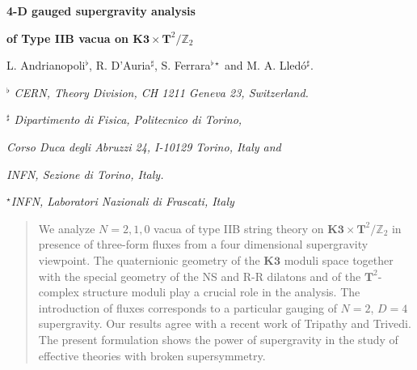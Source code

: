 \documentclass[a4paper,12pt]{article}
\begin{document}


\newcommand{\id}{\relax{\rm 1\kern-.28em 1}}

\newcommand{\R}{\mathbb{R}}
\newcommand{\C}{\mathbb{C}}
\newcommand{\Z}{\mathbb{Z}}


\newcommand{\K}{\mathbf{K3}}
\newcommand{\T}{\mathbf{T}}


\newcommand{\rSO}{\mathrm{SO}}
\newcommand{\rGL}{\mathrm{GL}}
\newcommand{\rSL}{\mathrm{SL}}
\newcommand{\rSU}{\mathrm{SU}}
\newcommand{\rSp}{\mathrm{Sp}}
\newcommand{\rUSp}{\mathrm{USp}}
\newcommand{\rU}{\mathrm{U}}

\newcommand{\fsu}{\mathfrak{su}}
\newcommand{\fso}{\mathfrak{so}}
\newcommand{\fh}{\mathfrak{h}}
\newcommand{\fp}{\mathfrak{p}}

\newcommand{\cM}{\mathcal{M}}
\newcommand{\cN}{\mathcal{N}}
\newcommand{\cL}{\mathcal{L}}
\newcommand{\cH}{\mathcal{H}}

\vskip 1cm


  \centerline{\LARGE \bf 4-D gauged supergravity analysis
  }

  \bigskip

  \centerline{\LARGE \bf  of Type IIB vacua on  $\K\times \T^2/\Z_2$
  }


 \vskip 1.5cm
\centerline{L. Andrianopoli$^\flat$, R. D'Auria$^\sharp$,  S.
Ferrara$^{\flat \star}$ and M. A. Lled\'o$^\sharp$.}

\vskip 1cm

\centerline{\it $^\flat$ CERN, Theory Division, CH 1211 Geneva 23,
Switzerland.}

\bigskip



\centerline{\it $^\sharp$ Dipartimento di Fisica, Politecnico di
Torino,} \centerline{\it Corso Duca degli Abruzzi 24, I-10129
Torino, Italy  and  } \centerline{\it   INFN, Sezione di Torino,
Italy. }

\bigskip




\centerline{$^\star$\it INFN, Laboratori Nazionali di Frascati,
Italy}







\vskip 1.5cm

\begin{abstract}
We analyze $N=2,1,0$ vacua of type IIB string theory on $\K\times
\T^2/\Z_2$ in presence of three-form fluxes from a four
dimensional supergravity viewpoint. The quaternionic geometry of
the $\K$ moduli space together with the special geometry of the NS
and R-R dilatons and of the $\T^2$-complex structure moduli play a
crucial role in the analysis. The introduction of fluxes
corresponds to a particular gauging of $N=2$, $D=4$ supergravity.
Our results agree with a recent work of Tripathy and Trivedi. The
present formulation shows the power of supergravity  in the study
of effective theories with broken supersymmetry.
\end{abstract}
\end{document}
